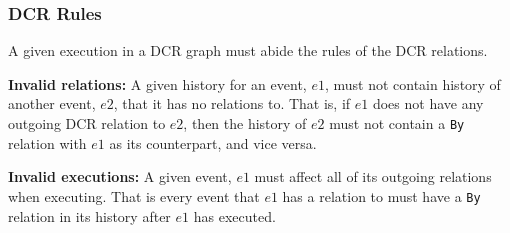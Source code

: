 	\subsubsection{DCR Rules}
	A given execution in a DCR graph must abide the rules of the DCR relations. 
	
	\newpar \textbf{Invalid relations:} A given history for an event, $e1$, must not contain history of another event, $e2$, that it has no relations to. That is, if $e1$ does not have any outgoing DCR relation to $e2$, then the history of $e2$ must not contain a \texttt{By} relation with $e1$ as its counterpart, and vice versa. 
	
	\newpar \textbf{Invalid executions:} A given event, $e1$ must affect all of its outgoing relations when executing. That is every event that $e1$ has a relation to must have a \texttt{By} relation in its history after $e1$ has executed.

